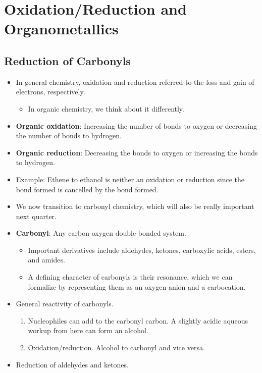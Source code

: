 \documentclass[../notes.tex]{subfiles}
\begin{document}
\chapter{Oxidation/Reduction and Organometallics}
\section{Reduction of Carbonyls}
\begin{itemize}
    \item {}In general chemistry, oxidation and reduction referred to the loss and gain of electrons, respectively.
    \begin{itemize}
        \item In organic chemistry, we think about it differently.
    \end{itemize}
    \item \textbf{Organic oxidation}: Increasing the number of bonds to oxygen or decreasing the number of bonds to hydrogen.
    \item \textbf{Organic reduction}: Decreasing the bonds to oxygen or increasing the bonds to hydrogen.
    \item Example: Ethene to ethanol is neither an oxidation or reduction since the  bond formed is cancelled by the  bond formed.
    \item We now transition to carbonyl chemistry, which will also be really important next quarter.
    \item \textbf{Carbonyl}: Any carbon-oxygen double-bonded system.
    \begin{itemize}
        \item Important derivatives include aldehydes, ketones, carboxylic acids, esters, and amides.
        \item A defining character of carbonyls is their resonance, which we can formalize by representing them as an oxygen anion and a carbocation.
    \end{itemize}
    \item General reactivity of carbonyls.
    \begin{enumerate}
        \item Nucleophiles can add to the carbonyl carbon. A slightly acidic aqueous workup from here can form an alcohol.
        \item Oxidation/reduction. Alcohol to carbonyl and vice versa.
    \end{enumerate}
    \item Reduction of aldehydes and ketones.

\end{itemize}
\end{document}
